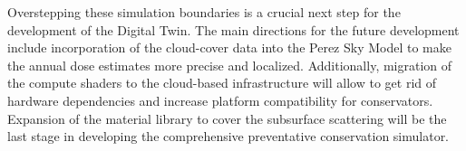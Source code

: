 Overstepping these simulation boundaries is a crucial next step for the development of the Digital Twin. The main directions for the future development include incorporation of the cloud-cover data into the Perez Sky Model to make the annual dose estimates more precise and localized. Additionally, migration of the compute shaders to the cloud-based infrastructure will allow to get rid of hardware dependencies and increase platform compatibility for conservators. Expansion of the material library to cover the subsurface scattering will be the last stage in developing the comprehensive preventative conservation simulator.
